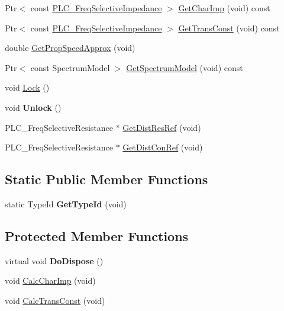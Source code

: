 \begin{DoxyCompactItemize}
\item 
\-Ptr$<$ const \*
\hyperlink{classns3_1_1PLC__FreqSelectiveValue}{\-P\-L\-C\-\_\-\-Freq\-Selective\-Impedance} $>$ \hyperlink{classns3_1_1PLC__Cable_a69891ab8cc93ca879bcdb45c3186c37e}{\-Get\-Char\-Imp} (void) const 
\item 
\-Ptr$<$ const \*
\hyperlink{classns3_1_1PLC__FreqSelectiveValue}{\-P\-L\-C\-\_\-\-Freq\-Selective\-Impedance} $>$ \hyperlink{classns3_1_1PLC__Cable_afbb84efd3e13af6c5bc0f937045e1580}{\-Get\-Trans\-Const} (void) const 
\item 
double \hyperlink{classns3_1_1PLC__Cable_a2261f8fa8054aadacbf274ac440f26bd}{\-Get\-Prop\-Speed\-Approx} (void)
\item 
\-Ptr$<$ const \-Spectrum\-Model $>$ \hyperlink{classns3_1_1PLC__Cable_a0cae55f20d768e2aba32af7bb4afb18a}{\-Get\-Spectrum\-Model} (void) const 
\item 
void \hyperlink{classns3_1_1PLC__Cable_a684124d04e51bb5129a40eb91acd9325}{\-Lock} ()
\item 
\hypertarget{classns3_1_1PLC__Cable_ae159d0b279ae1701b9e209e62fe37d40}{void {\bfseries \-Unlock} ()}\label{classns3_1_1PLC__Cable_ae159d0b279ae1701b9e209e62fe37d40}

\item 
\-P\-L\-C\-\_\-\-Freq\-Selective\-Resistance $\ast$ \hyperlink{classns3_1_1PLC__Cable_a6d56a49753e96196990474f68a2d4ee5}{\-Get\-Dist\-Res\-Ref} (void)
\item 
\-P\-L\-C\-\_\-\-Freq\-Selective\-Resistance $\ast$ \hyperlink{classns3_1_1PLC__Cable_a5e917bd164a75c139c4c20e55cd55a7f}{\-Get\-Dist\-Con\-Ref} (void)
\end{DoxyCompactItemize}
\subsection*{\-Static \-Public \-Member \-Functions}
\begin{DoxyCompactItemize}
\item 
\hypertarget{classns3_1_1PLC__Cable_af9d947e4c9acbcfe90fe1f01abe01958}{static \-Type\-Id {\bfseries \-Get\-Type\-Id} (void)}\label{classns3_1_1PLC__Cable_af9d947e4c9acbcfe90fe1f01abe01958}

\end{DoxyCompactItemize}
\subsection*{\-Protected \-Member \-Functions}
\begin{DoxyCompactItemize}
\item 
\hypertarget{classns3_1_1PLC__Cable_a9f8219844d8a0663a280faee130a38f0}{virtual void {\bfseries \-Do\-Dispose} ()}\label{classns3_1_1PLC__Cable_a9f8219844d8a0663a280faee130a38f0}

\item 
void \hyperlink{classns3_1_1PLC__Cable_a7496b6ac6c63ce30273bdec71a1bc98b}{\-Calc\-Char\-Imp} (void)
\item 
void \hyperlink{classns3_1_1PLC__Cable_a7747327635fcafdbbe8abe9b0db2e3b0}{\-Calc\-Trans\-Const} (void)
\end{DoxyCompactItemize}
